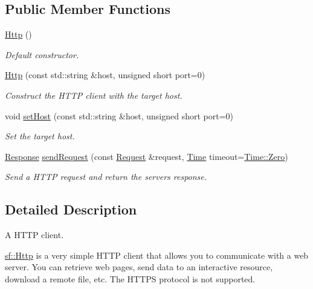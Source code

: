 \subsection*{Public Member Functions}
\begin{DoxyCompactItemize}
\item 
\mbox{\label{classsf_1_1_http_abe2360194f99bdde402c9f97a85cf067}} 
\hyperlink{classsf_1_1_http_abe2360194f99bdde402c9f97a85cf067}{Http} ()
\begin{DoxyCompactList}\small\item\em Default constructor. \end{DoxyCompactList}\item 
\hyperlink{classsf_1_1_http_a79efd844a735f083fcce0edbf1092385}{Http} (const std\+::string \&host, unsigned short port=0)
\begin{DoxyCompactList}\small\item\em Construct the H\+T\+TP client with the target host. \end{DoxyCompactList}\item 
void \hyperlink{classsf_1_1_http_a55121d543b61c41cf20b885a97b04e65}{set\+Host} (const std\+::string \&host, unsigned short port=0)
\begin{DoxyCompactList}\small\item\em Set the target host. \end{DoxyCompactList}\item 
\hyperlink{classsf_1_1_http_1_1_response}{Response} \hyperlink{classsf_1_1_http_aaf09ebfb5e00dcc82e0d494d5c6a9e2a}{send\+Request} (const \hyperlink{classsf_1_1_http_1_1_request}{Request} \&request, \hyperlink{classsf_1_1_time}{Time} timeout=\hyperlink{classsf_1_1_time_a8db127b632fa8da21550e7282af11fa0}{Time\+::\+Zero})
\begin{DoxyCompactList}\small\item\em Send a H\+T\+TP request and return the server\textquotesingle{}s response. \end{DoxyCompactList}\end{DoxyCompactItemize}


\subsection{Detailed Description}
A H\+T\+TP client. 

\hyperlink{classsf_1_1_http}{sf\+::\+Http} is a very simple H\+T\+TP client that allows you to communicate with a web server. You can retrieve web pages, send data to an interactive resource, download a remote file, etc. The H\+T\+T\+PS protocol is not supported.

